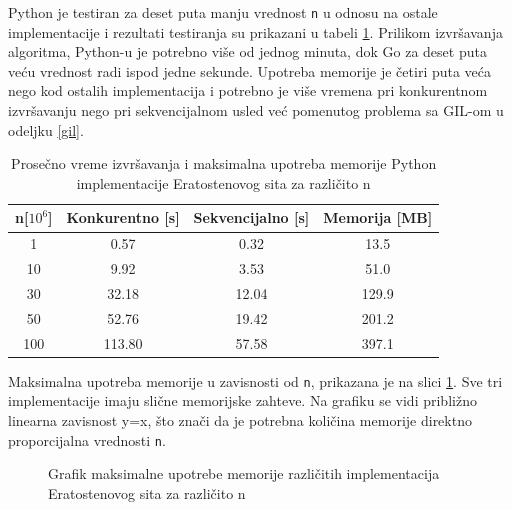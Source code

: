 \documentclass[12pt,oneside]{memoir}
\begin{document}
Python je testiran za deset puta manju vrednost \texttt{n} u odnosu na ostale implementacije i rezultati testiranja su prikazani u tabeli \ref{tab:prime1}. Prilikom izvršavanja algoritma, Python-u je potrebno više od jednog minuta, dok Go za deset puta veću vrednost radi ispod jedne sekunde. Upotreba memorije je četiri puta veća nego kod ostalih implementacija i potrebno je više vremena pri konkurentnom izvršavanju nego pri sekvencijalnom usled već pomenutog problema sa GIL-om u odeljku \ref{gil}.
\\

\begin{table}
\begin{center}
\caption{Prosečno vreme izvršavanja i maksimalna upotreba memorije Python implementacije Eratostenovog sita za različito n}
\begin{tabular}{||c||c|c|c||}
\hline
n[$10^{6}$] & Konkurentno [s]& Sekvencijalno [s] & Memorija [MB] \\ \hline
1	&0.57	&0.32&13.5\\
10	&9.92&3.53&51.0\\
30	&32.18&12.04&129.9\\
50	&52.76&19.42&201.2\\
100	&113.80&57.58&397.1\\
\hline
\end{tabular}
\label{tab:prime1}
\end{center}
\end{table}

Maksimalna upotreba memorije u zavisnosti od \texttt{n}, prikazana je na slici \ref{fig:prime2}. Sve tri implementacije imaju slične memorijske zahteve. Na grafiku se vidi približno linearna zavisnost y=x, što znači da je potrebna količina memorije direktno proporcijalna vrednosti \texttt{n}.
\\

\begin{figure}
\begin{center}


\caption{Grafik maksimalne upotrebe memorije različitih implementacija Eratostenovog sita za različito n}
\label{fig:prime2}
\end{center}
\end{figure}
\end{document}
